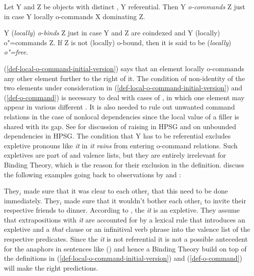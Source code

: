 \documentclass[output=paper
	        ,collection
	        ,collectionchapter
 	        ,biblatex
                ,babelshorthands
                ,newtxmath
                ,draftmode
                ,colorlinks, citecolor=brown
]{langscibook}
\begin{document}
\ea
\label{def-o-command}
Let Y and Z be  objects with distinct \localvs, Y referential. Then Y \emph{o-commands} Z just
in case Y locally o-commands X dominating Z.
\z

\ea
\label{def-o-bind}
Y (\emph{locally}) \emph{o-binds} Z just in case Y and Z are coindexed and Y (locally) o"=commands Z. If Z
is not (locally) o-bound, then it is said to be (\emph{locally}) \emph{o"=free}.
\z

\noindent
(\ref{def-local-o-command-initial-version}) says that an \argst element locally o-commands any other \argst element
further to the right of it. The condition of non-identity of the two elements under consideration in
(\ref{def-local-o-command-initial-version}) and (\ref{def-o-command}) is necessary to deal with cases of , in
which one element may appear in various different \argstls. It is also needed to rule out unwanted
command relations in the case of nonlocal dependencies since the local value of a filler is shared
with its gap. See %
 for discussion of raising in HPSG and  on
unbounded dependencies in HPSG. The condition that Y has
to be referential excludes expletive pronouns like \emph{it} in \emph{it rains} from entering
o-command relations. Such expletives are part of \argst and valence lists, but they are entirely
irrelevant for Binding Theory, which is the reason for their exclusion in the
definition. \citet[]{ps2} discuss the following examples going back to observations by
\citet[]{FH83a-u} and \citet[]{Kuno87a-u}:

\eal
\ex They$_i$ made sure that it was clear to each other$_i$ that this need to be done immediately.
\ex They$_i$ made sure that it wouldn't bother each other$_i$ to invite their respective friends to dinner.
\zl
According to \citet[Section~3.6]{ps2}, the \emph{it} is an expletive. They assume that extrapositions with
\emph{it} are accounted for by a lexical rule that introduces an expletive and a \emph{that} clause
or an infinitival verb phrase into the valence list of the respective predicates. Since the
\emph{it} is not referential it is not a possible antecedent for the anaphors in sentences like () and hence
a Binding Theory build on top of the definitions in (\ref{def-local-o-command-initial-version}) and (\ref{def-o-command}) will make the right predictions.
\end{document}
